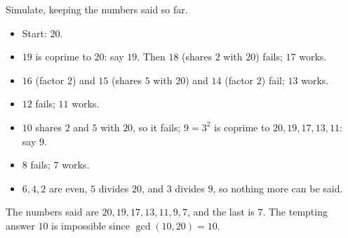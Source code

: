 Simulate, keeping the numbers said so far.
\begin{itemize}
\item Start: $20$.
\item $19$ is coprime to $20$: say $19$. Then $18$ (shares $2$ with $20$) fails; $17$ works.
\item $16$ (factor $2$) and $15$ (shares $5$ with $20$) and $14$ (factor $2$) fail; $13$ works.
\item $12$ fails; $11$ works.
\item $10$ shares $2$ and $5$ with $20$, so it fails; $9=3^2$ is coprime to $20,19,17,13,11$: say $9$.
\item $8$ fails; $7$ works.
\item $6,4,2$ are even, $5$ divides $20$, and $3$ divides $9$, so nothing more can be said.
\end{itemize}
The numbers said are $20,19,17,13,11,9,7$, and the last is $\boxed{7}$. The tempting answer $10$ is impossible since $\gcd(10,20)=10$.
